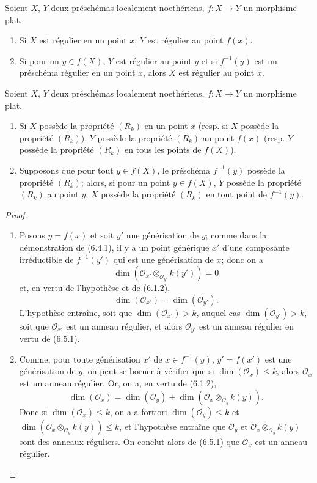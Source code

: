 \begin{corollary}[6.5.2]
\label{IV.2.s6.5.2-fr}
Soient $X$, $Y$ deux préschémas localement noethériens, $f:X\to Y$
un morphisme plat.
\begin{enumerate}
\item[(i)] Si $X$ est régulier en un point $x$, $Y$ est régulier au point
$f(x)$.
\item[(ii)] Si pour un $y\in f(X)$, $Y$ est régulier au point $y$ et si
$f^{-1}(y)$ est un préschéma régulier en un point $x$, alors $X$ est
régulier au point $x$.
\end{enumerate}
\end{corollary}

\begin{proposition}[6.5.3]
\label{IV.2.s6.5.3-fr}
Soient $X$, $Y$ deux préschémas localement noethériens, $f:X\to Y$
un morphisme plat.
\begin{enumerate}
\item[(i)] Si $X$ possède la propriété $(R_k)$ en un point $x$
(resp. si $X$ possède la propriété $(R_k)$), $Y$ possède la propriété
$(R_k)$ au point $f(x)$ (resp. $Y$ possède la propriété $(R_k)$ en tous
les points de $f(X)$).
\item[(ii)] Supposons que pour tout $y\in f(X)$, le préschéma
$f^{-1}(y)$ possède la propriété $(R_k)$; alors, si pour un point
$y\in f(X)$, $Y$ possède la propriété $(R_k)$ au point $y$, $X$ possède
la propriété $(R_k)$ en tout point de $f^{-1}(y)$.
\end{enumerate}
\end{proposition}

\begin{proof}
\medskip\noindent
\begin{enumerate}
\item[(i)] Posons $y=f(x)$ et soit $y'$ une générisation de $y$; comme
dans la démonstration de (6.4.1), il y a un point générique $x'$ d'une
composante irréductible de $f^{-1}(y')$ qui est une générisation de $x$;
donc on a
\[
\dim(\mathcal O_{x'}\otimes_{\mathcal O_{y'}}k(y'))=0
\]
et, en vertu de l'hypothèse et de (6.1.2),
\[
\dim(\mathcal O_{x'})=\dim(\mathcal O_{y'}).
\]
L'hypothèse entraîne, soit que
$\dim(\mathcal O_{x'})>k$, auquel cas
$\dim(\mathcal O_{y'})>k$, soit que $\mathcal O_{x'}$ est un anneau
régulier, et alors $\mathcal O_{y'}$ est un anneau régulier en vertu de
(6.5.1).

\item[(ii)] Comme, pour toute générisation $x'$ de $x\in f^{-1}(y)$,
$y'=f(x')$ est une générisation de $y$, on peut se borner à vérifier que
si $\dim(\mathcal O_x)\leqslant k$, alors $\mathcal O_x$ est un anneau
régulier. Or, on a, en vertu de (6.1.2),
\[
\dim(\mathcal O_x)=\dim(\mathcal O_y)
+\dim(\mathcal O_x\otimes_{\mathcal O_y}k(y)).
\]
Donc si $\dim(\mathcal O_x)\leqslant k$, on a a fortiori
$\dim(\mathcal O_y)\leqslant k$ et
$\dim(\mathcal O_x\otimes_{\mathcal O_y}k(y))\leqslant k$, et l'hypothèse
entraîne que $\mathcal O_y$ et
$\mathcal O_x\otimes_{\mathcal O_y}k(y)$ sont des anneaux réguliers. On
conclut alors de (6.5.1) que $\mathcal O_x$ est un anneau régulier.
\end{enumerate}
\end{proof}


